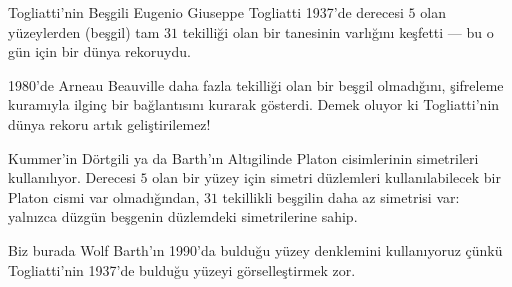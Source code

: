 \begin{surferPage}{Togliatti'nin Beşgili}
    Eugenio Giuseppe Togliatti 1937'de derecesi $5$ olan  yüzeylerden (beşgil)  
tam $31$ tekilliği olan bir tanesinin varlığını keşfetti --- bu o gün için bir dünya rekoruydu.

1980'de Arneau Beauville daha fazla tekilliği olan bir beşgil olmadığını, şifreleme kuramıyla ilginç bir bağlantısını kurarak gösterdi. Demek oluyor ki Togliatti'nin dünya rekoru artık geliştirilemez!

Kummer'in Dörtgili ya da Barth'ın Altıgilinde Platon cisimlerinin simetrileri kullanılıyor.
Derecesi $5$ olan bir yüzey için simetri düzlemleri kullanılabilecek bir Platon cismi var olmadığından,
 $31$ tekillikli beşgilin daha az simetrisi var: yalnızca düzgün beşgenin düzlemdeki simetrilerine sahip.

Biz burada  Wolf Barth'ın  1990'da bulduğu yüzey denklemini kullanıyoruz çünkü Togliatti'nin 1937'de bulduğu yüzeyi görselleştirmek zor.
\end{surferPage}
